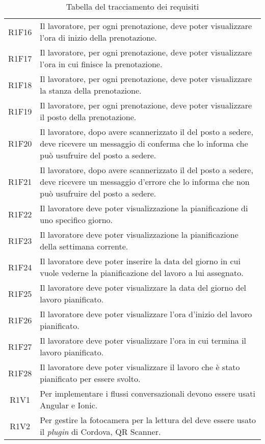 \begin{table}[h]%
		\renewcommand{\arraystretch}{1.5}
	\centering
	\begin{tabularx}{\textwidth}{c X}
		\hline		
		\rowcolor{heavenly}
		\intest{Codice} &  \intest{Descrizione} \\	
		\hline
		R1F16 & Il lavoratore, per ogni prenotazione, deve poter visualizzare l'ora di inizio della prenotazione.\\
		R1F17 & Il lavoratore, per ogni prenotazione, deve poter visualizzare l'ora in cui finisce la prenotazione.\\		
		R1F18 & Il lavoratore, per ogni prenotazione, deve poter visualizzare la stanza della prenotazione.\\
		R1F19 & Il lavoratore, per ogni prenotazione, deve poter visualizzare il posto della prenotazione.\\	
		R1F20 & Il lavoratore, dopo avere scannerizzato il \g{QR code} del posto a sedere, deve ricevere un messaggio di conferma che lo informa che può usufruire del posto a sedere.\\
		R1F21 & Il lavoratore, dopo avere scannerizzato il \g{QR code} del posto a sedere, deve ricevere un messaggio d'errore che lo informa che non può usufruire del posto a sedere.\\
		R1F22 & Il lavoratore deve poter visualizzazione la pianificazione di uno specifico giorno.\\
		R1F23 & Il lavoratore deve poter visualizzazione la pianificazione della settimana corrente.\\
		R1F24 & Il lavoratore deve poter inserire la data del giorno in cui vuole vederne la pianificazione del lavoro a lui assegnato.\\
		R1F25 & Il lavoratore deve poter visualizzare la data del giorno del lavoro pianificato.\\
		R1F26 & Il lavoratore deve poter visualizzare l'ora d'inizio del lavoro pianificato.\\
		R1F27 & Il lavoratore deve poter visualizzare l'ora in cui termina il lavoro pianificato.\\
		R1F28 & Il lavoratore deve poter visualizzare il lavoro che è stato pianificato per essere svolto.\\
		R1V1 & Per implementare i flussi conversazionali devono essere usati Angular e Ionic.\\
		R1V2 & Per gestire la fotocamera per la lettura del \g{QR code} deve essere usato il \emph{plugin} di Cordova, QR Scanner.\\
		\hline	
	\end{tabularx} \hbox{}
	\caption{Tabella del tracciamento dei requisiti}
\end{table}%
\clearpage
